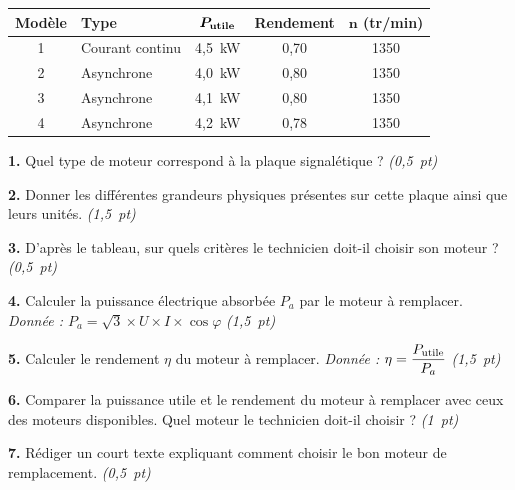 \documentclass[11pt,a4paper]{article}
\renewcommand{\arraystretch}{1.8}
\newcommand{\cadreblanc}[1]{%
	\medskip\framebox[\linewidth][c]{%
		\rule{0mm}{#1mm}}\par
	\medskip}
\begin{document}
\vspace{4mm}

\begin{center}
	\renewcommand{\arraystretch}{1.8}
	\begin{tabular}{|c|l|c|c|c|}
		\hline
		\textbf{Modèle} & \textbf{Type} & $\boldsymbol{P_{\rm utile}}$ & \textbf{Rendement} & $\boldsymbol{n}$ (tr/min) \\
		\hline
		1 & Courant continu & 4,5~kW & 0,70 & 1350 \\
		\hline
		2 & Asynchrone & 4,0~kW & 0,80 & 1350 \\
		\hline
		3 & Asynchrone & 4,1~kW & 0,80 & 1350 \\
		\hline
		4 & Asynchrone & 4,2~kW & 0,78 & 1350 \\
		\hline
	\end{tabular}
\end{center}

\vspace{5mm}

\textbf{1.} Quel type de moteur correspond à la plaque signalétique ? \hfill \textit{(0,5~pt)}

\cadreblanc{12}

\textbf{2.} Donner les différentes grandeurs physiques présentes sur cette plaque ainsi que leurs unités.
\hfill \textit{(1,5~pt)}

\cadreblanc{20}

\textbf{3.} D'après le tableau, sur quels critères le technicien doit-il choisir son moteur ?
\hfill \textit{(0,5~pt)}

\cadreblanc{14}

\textbf{4.} Calculer la puissance électrique absorbée $P_a$ par le moteur à remplacer.
\hfill \textit{Donnée : $P_a = \sqrt{3} \times U \times I \times \cos\varphi$}
\hfill \textit{(1,5~pt)}

\cadreblanc{18}

\textbf{5.} Calculer le rendement $\eta$ du moteur à remplacer.
\hfill \textit{Donnée : $\eta = \dfrac{P_{\rm utile}}{P_a}$}
\hfill \textit{(1,5~pt)}

\cadreblanc{18}

\textbf{6.} Comparer la puissance utile et le rendement du moteur à remplacer avec ceux des moteurs disponibles. Quel moteur le technicien doit-il choisir ? \hfill \textit{(1~pt)}

\cadreblanc{16}

\textbf{7.} Rédiger un court texte expliquant comment choisir le bon moteur de remplacement.
\hfill \textit{(0,5~pt)}
\end{document}
